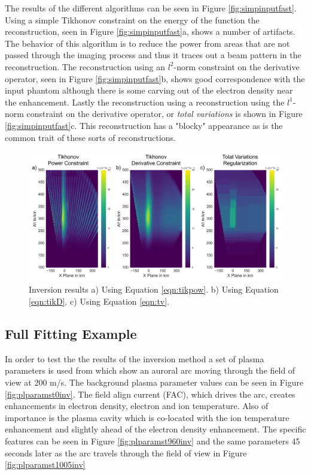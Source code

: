 The results of the different algorithms can be seen in Figure \ref{fig:simpinputfast}. Using a simple Tikhonov constraint on the energy of the function the reconstruction, seen in Figure \ref{fig:simpinputfast}a, shows a number of artifacts. The behavior of this algorithm is to reduce the power from areas that are not passed through the imaging process and thus it traces out a beam pattern in the reconstruction. The reconstruction using an $l^2$-norm constraint on the derivative operator, seen in Figure \ref{fig:simpinputfast}b, shows good correspondence with the input phantom although there is some carving out of the electron density near the enhancement. Lastly the reconstruction using a reconstruction using the $l^1$-norm constraint on the derivative operator, or \textit{total variations} is shown in Figure \ref{fig:simpinputfast}c. This reconstruction has a "blocky" appearance as is the common trait of these sorts of reconstructions.

\begin{figure}[!ht]
\centering
\includegraphics[width=6in]{Simpleinvertedfaster}
\caption{Inversion results a) Using Equation \ref{eqn:tikpow}.  b) Using Equation \ref{eqn:tikD}. c) Using Equation \ref{eqn:tv}.}
\label{fig:simpoutputfast}
\end{figure}

\subsection{Full Fitting Example}

In order to test the the results of the inversion method a set of plasma parameters is used from \citet{Perry:2015jf} which show an auroral arc moving through the field of view at 200 m/s. The background plasma parameter values can be seen in Figure \ref{fig:plparamst0inv}. The field align current (FAC), which drives the arc, creates enhancements in electron density, electron and ion temperature. Also of importance is the plasma cavity which is co-located with the ion temperature enhancement and slightly ahead of the electron density enhancement. The specific features can be seen in Figure \ref{fig:plparamst960inv} and the same parameters 45 seconds later as the arc travels through the field of view in Figure \ref{fig:plparamst1005inv}

